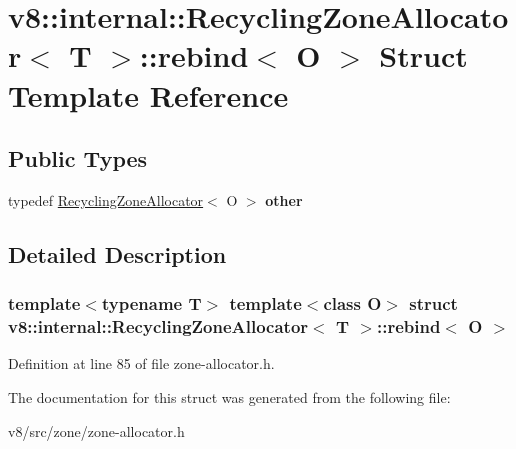 \hypertarget{structv8_1_1internal_1_1RecyclingZoneAllocator_1_1rebind}{}\section{v8\+:\+:internal\+:\+:Recycling\+Zone\+Allocator$<$ T $>$\+:\+:rebind$<$ O $>$ Struct Template Reference}
\label{structv8_1_1internal_1_1RecyclingZoneAllocator_1_1rebind}
\subsection*{Public Types}
\begin{DoxyCompactItemize}
\item 
\mbox{\label{structv8_1_1internal_1_1RecyclingZoneAllocator_1_1rebind_a8e252a9d09fb5bedbec6748463cdd636}} 
typedef \mbox{\hyperlink{classv8_1_1internal_1_1RecyclingZoneAllocator}{Recycling\+Zone\+Allocator}}$<$ O $>$ {\bfseries other}
\end{DoxyCompactItemize}


\subsection{Detailed Description}
\subsubsection*{template$<$typename T$>$\newline
template$<$class O$>$\newline
struct v8\+::internal\+::\+Recycling\+Zone\+Allocator$<$ T $>$\+::rebind$<$ O $>$}



Definition at line 85 of file zone-\/allocator.\+h.



The documentation for this struct was generated from the following file\+:\begin{DoxyCompactItemize}
\item 
v8/src/zone/zone-\/allocator.\+h\end{DoxyCompactItemize}
